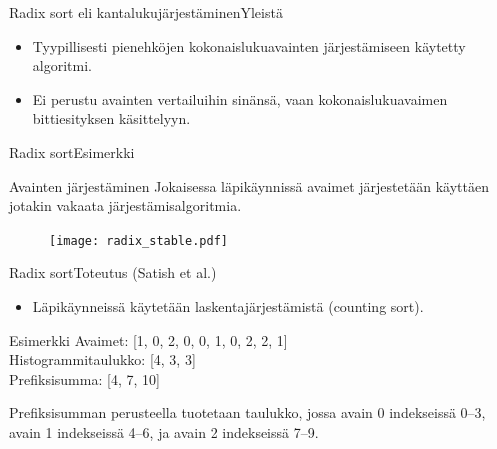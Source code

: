 \documentclass{beamer}
\begin{document}
\begin{frame}{Radix sort eli kantalukujärjestäminen}{Yleistä}
    \begin{itemize}
      \item
        Tyypillisesti pienehköjen kokonaislukuavainten järjestämiseen käytetty algoritmi.
      \item
        Ei perustu avainten vertailuihin sinänsä, vaan kokonaislukuavaimen bittiesityksen käsittelyyn.
    \end{itemize}
\end{frame}

\begin{frame}{Radix sort}{Esimerkki}
\begin{exampleblock}{Avainten järjestäminen}
Jokaisessa läpikäynnissä avaimet järjestetään käyttäen jotakin vakaata järjestämisalgoritmia.
\begin{figure}
    \texttt{[image: radix\_stable.pdf]}
\end{figure}
\end{exampleblock}
\end{frame}

\begin{frame}{Radix sort}{Toteutus (Satish et al.)}
    \begin{itemize}
      \item
        Läpikäynneissä käytetään laskentajärjestämistä (counting sort).
    \end{itemize}
\begin{exampleblock}{Esimerkki}
Avaimet: [1, 0, 2, 0, 0, 1, 0, 2, 2, 1] \\
Histogrammitaulukko: [4, 3, 3] \\
Prefiksisumma: [4, 7, 10] \\
\end{exampleblock}
Prefiksisumman perusteella tuotetaan taulukko, jossa avain 0 indekseissä 0--3, avain 1 indekseissä 4--6, ja avain 2 indekseissä 7--9.
\end{frame}
\end{document}
